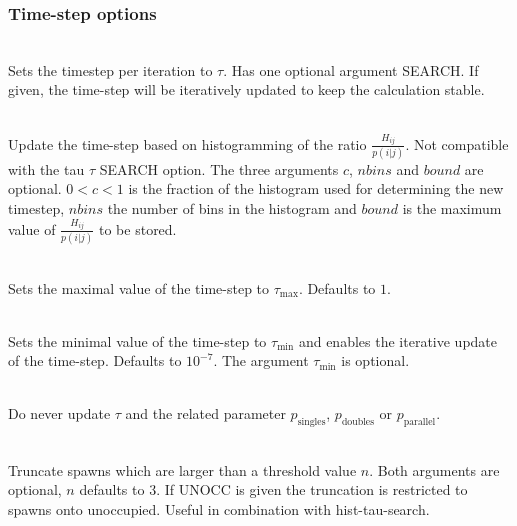 \documentclass[a4paper,notitlepage]{scrreprt}
\newcommand\codeitem[1]{\needspace{1.5\baselineskip}\item[\textnormal{\ttfamily #1 \nopagebreak}] \hfill \\ \nopagebreak}
\begin{document}
  \subsubsection{Time-step options}
  \begin{description}
    \codeitem{\textcolor{mred}{tau $\tau$} SEARCH}
    Sets the timestep per iteration to $\tau$. Has one optional argument
    SEARCH. If given, the time-step will be iteratively updated to keep the
    calculation stable.
    \codeitem{\textcolor{oblue}{hist-tau-search $c$ $nbins$ $bound$}}
    Update the time-step based on histogramming of the ratio
    $\frac{H_{ij}}{p(i|j)}$. Not compatible with the tau $\tau$ SEARCH
    option. The three arguments $c$, $nbins$ and $bound$ are
    optional. $0<c<1$ is the fraction of the histogram used for determining
    the new timestep, $nbins$ the number of bins in the histogram and $bound$
    is the maximum value of $\frac{H_{ij}}{p(i|j)}$ to be stored.
    \codeitem{\textcolor{oblue}{max-tau $\tau_\text{max}$}}
    Sets the maximal value of the time-step to $\tau_\text{max}$. Defaults to
    $1$.    
    \codeitem{min-tau $\tau_\text{min}$}
    Sets the minimal value of the time-step to $\tau_\text{min}$ and enables
    the iterative update of the time-step. Defaults to
    $10^{-7}$. The argument $\tau_\text{min}$ is optional.
    \codeitem{keepTauFixed}
    Do never update $\tau$ and the related parameter $p_\text{singles}$,
    $p_\text{doubles}$ or $p_\text{parallel}$.
    \codeitem{truncate-spawns $n$ UNOCC}
    Truncate spawns which are larger than a threshold value $n$. Both
    arguments are optional, $n$ defaults to $3$. If UNOCC is given the
    truncation is restricted to spawns onto unoccupied. Useful in combination
    with hist-tau-search.
  \end{description}
\end{document}

